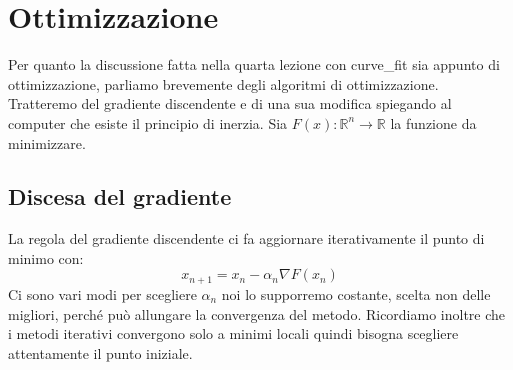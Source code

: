 \documentclass[10pt,a4paper]{article}
\begin{document}
\newpage

\section{Ottimizzazione}
Per quanto la discussione fatta nella quarta lezione con curve\_fit sia appunto di ottimizzazione, parliamo brevemente degli algoritmi di ottimizzazione. Tratteremo del gradiente discendente e di una sua modifica spiegando al computer che esiste il principio di inerzia.
Sia $F(x): \mathbb{R}^n \rightarrow \mathbb{R}$ la funzione da minimizzare. 
\subsection{Discesa del gradiente}
La regola del gradiente discendente ci fa aggiornare iterativamente il punto di minimo con:
\begin{equation}
x_{n+1} = x_n - \alpha_n \nabla F(x_n)
\end{equation}
Ci sono vari modi per scegliere $\alpha_n$ noi lo supporremo costante, scelta non delle migliori, perché può allungare la convergenza del metodo. Ricordiamo inoltre che i metodi iterativi convergono solo a minimi locali quindi bisogna scegliere attentamente il punto iniziale.
\end{document}

